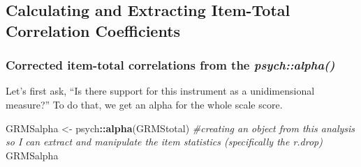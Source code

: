 \documentclass[
  english,
]{book}
\newenvironment{Shaded}{\begin{snugshade}}{\end{snugshade}}
\newcommand{\CommentTok}[1]{\textcolor[rgb]{0.56,0.35,0.01}{\textit{#1}}}
\newcommand{\KeywordTok}[1]{\textcolor[rgb]{0.13,0.29,0.53}{\textbf{#1}}}
\newcommand{\NormalTok}[1]{#1}
\newcommand{\OperatorTok}[1]{\textcolor[rgb]{0.81,0.36,0.00}{\textbf{#1}}}
\newcommand{\StringTok}[1]{\textcolor[rgb]{0.31,0.60,0.02}{#1}}
\begin{document}
\hypertarget{calculating-and-extracting-item-total-correlation-coefficients}{%
\subsection{Calculating and Extracting Item-Total Correlation Coefficients}\label{calculating-and-extracting-item-total-correlation-coefficients}}

\hypertarget{corrected-item-total-correlations-from-the-psychalpha}{%
\subsubsection{\texorpdfstring{Corrected item-total correlations from the \emph{psych::alpha()}}{Corrected item-total correlations from the psych::alpha()}}\label{corrected-item-total-correlations-from-the-psychalpha}}

Let's first ask, ``Is there support for this instrument as a unidimensional measure?'' To do that, we get an alpha for the whole scale score.

\begin{Shaded}
\begin{Highlighting}[]
\NormalTok{GRMSalpha <-}\StringTok{ }\NormalTok{psych}\OperatorTok{::}\KeywordTok{alpha}\NormalTok{(GRMStotal) }\CommentTok{#creating an object from this analysis so I can extract and manipulate the item statistics (specifically the r.drop)}
\NormalTok{GRMSalpha}
\end{Highlighting}
\end{Shaded}
\end{document}
